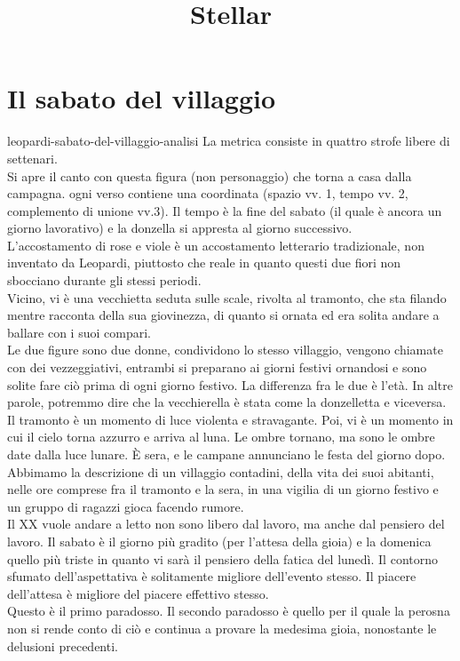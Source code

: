 \documentclass[preview]{standalone}
\begin{document}
\title{Stellar}
\genpage

\section{Il sabato del villaggio}


\begin{snippet}{leopardi-sabato-del-villaggio-analisi}
    La metrica consiste in quattro strofe libere di settenari.
    \\
    Si apre il canto con questa figura (non personaggio) che torna a casa dalla campagna.
    ogni verso contiene una coordinata (spazio vv. 1, tempo vv. 2, complemento di unione vv.3).
    Il tempo è la fine del sabato (il quale è ancora un giorno lavorativo)
    e la donzella si appresta al giorno successivo.
    \\
    L'accostamento di rose e viole è un accostamento letterario tradizionale,
    non inventato da Leopardi, piuttosto che reale in quanto
    questi due fiori non sbocciano durante gli stessi periodi.
    \\
    Vicino, vi è una vecchietta seduta sulle scale, rivolta al tramonto,
    che sta filando mentre racconta della sua giovinezza, di quanto si ornata
    ed era solita andare a ballare con i suoi compari.
    \\
    Le due figure sono due donne, condividono lo stesso villaggio,
    vengono chiamate con dei vezzeggiativi, entrambi si preparano ai giorni festivi ornandosi
    e sono solite fare ciò prima di ogni giorno festivo.
    La differenza fra le due è l'età.
    In altre parole, potremmo dire che la vecchierella è stata come la donzelletta
    e viceversa.
    \\
    Il tramonto è un momento di luce violenta e stravagante. Poi, vi è un momento in cui
    il cielo torna azzurro e arriva al luna. Le ombre tornano, ma sono le ombre date dalla
    luce lunare.
    È sera, e le campane annunciano le festa del giorno dopo.
    \\
    Abbimamo la descrizione di un villaggio contadini, della vita dei suoi abitanti,
    nelle ore comprese fra il tramonto e la sera, in una vigilia di un giorno festivo
    e un gruppo di ragazzi gioca facendo rumore.
    \\
    Il XX vuole andare a letto non sono libero dal lavoro, ma anche dal pensiero del lavoro.
    Il sabato è il giorno più gradito (per l'attesa della gioia) e la domenica quello più triste in quanto
    vi sarà il pensiero della fatica del lunedì.
    Il contorno sfumato dell'aspettativa è solitamente migliore dell'evento stesso.
    Il piacere dell'attesa è migliore del piacere effettivo stesso.
    \\
    Questo è il primo paradosso.
    Il secondo paradosso è quello per il quale la perosna non si rende conto di ciò
    e continua a provare la medesima gioia, nonostante le delusioni precedenti.
\end{snippet}
\end{document}
